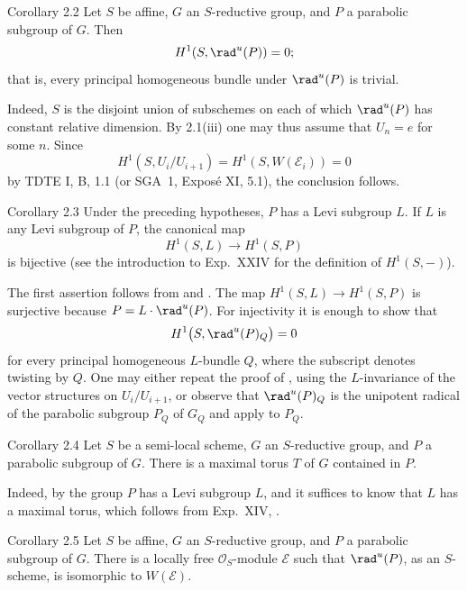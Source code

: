\begin{sgastatement}{Corollary 2.2}
Let \(S\) be affine, \(G\) an \(S\)-reductive group, and \(P\) a parabolic
subgroup of \(G\).  Then
\[
 H^1(S,\rad^u(P))=0;
\]
that is, every principal homogeneous bundle under \(\rad^u(P)\) is
trivial.
\end{sgastatement}

Indeed, \(S\) is the disjoint union of subschemes on each of which
\(\rad^u(P)\) has constant relative dimension.  By 2.1(iii) one may thus
assume that \(U_n=e\) for some \(n\).  Since
\[
 H^1(S,U_i/U_{i+1})
 =H^1(S,W(\mathcal E_i))=0
\]
by TDTE I, B, 1.1 (or SGA~1, Exposé XI, 5.1), the conclusion follows.

\begin{sgastatement}{Corollary 2.3}
Under the preceding hypotheses, \(P\) has a Levi subgroup \(L\).  If
\(L\) is any Levi subgroup of \(P\), the canonical map
\[
 H^1(S,L)\longrightarrow H^1(S,P)
\]
is bijective \textup{(see the introduction to Exp.\ XXIV for the
definition of \(H^1(S,-)\))}.
\end{sgastatement}

The first assertion follows from  and .  The map
\(H^1(S,L)\to H^1(S,P)\) is surjective because
\(P=L\cdot\rad^u(P)\).  For injectivity it is enough to show that
\[
 H^1\bigl(S,\rad^u(P)_Q\bigr)=0
\]
for every principal homogeneous \(L\)-bundle \(Q\), where the subscript
denotes twisting by \(Q\).  One may either repeat the proof of , using
the \(L\)-invariance of the vector structures on \(U_i/U_{i+1}\), or
observe that \(\rad^u(P)_Q\) is the unipotent radical of the parabolic
subgroup \(P_Q\) of \(G_Q\) and apply  to \(P_Q\).

\begin{sgastatement}{Corollary 2.4}
Let \(S\) be a semi-local scheme, \(G\) an \(S\)-reductive group, and
\(P\) a parabolic subgroup of \(G\).  There is a maximal torus \(T\) of
\(G\) contained in \(P\).
\end{sgastatement}

Indeed, by  the group \(P\) has a Levi subgroup \(L\), and it suffices
to know that \(L\) has a maximal torus, which follows from Exp.\ XIV,
.

\begin{sgastatement}{Corollary 2.5}
Let \(S\) be affine, \(G\) an \(S\)-reductive group, and \(P\) a parabolic
subgroup of \(G\).  There is a locally free \(\mathcal O_S\)-module
\(\mathcal E\) such that \(\rad^u(P)\), as an \(S\)-scheme, is isomorphic
to \(W(\mathcal E)\).
\end{sgastatement}

